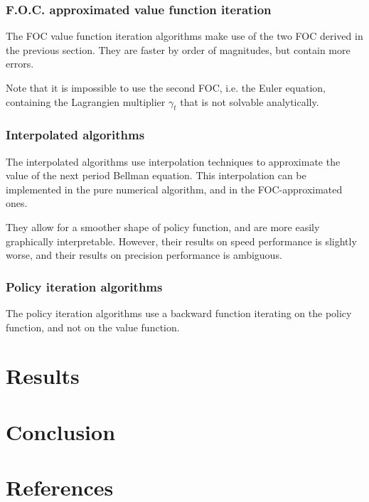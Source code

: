 \documentclass{article}
\begin{document}
\subsubsection{F.O.C. approximated value function iteration}

The FOC value function iteration algorithms
make use of the two FOC
derived in the previous section. 
They are faster by order of magnitudes,
but contain more errors.

Note that it is impossible to use the second FOC, i.e. the 
Euler equation, containing the 
Lagrangien multiplier $\gamma_{t}$ that
is not solvable analytically. 

\subsubsection{Interpolated algorithms}

The interpolated algorithms 
use interpolation techniques to approximate 
the value of the next period Bellman equation. 
This interpolation can be implemented in the pure numerical 
algorithm, and in the FOC-approximated ones. 

They allow for a smoother shape of policy function, 
and are more easily graphically interpretable.
However, 
their results on speed
performance is slightly worse, 
and their results on precision
performance is ambiguous. 

\subsubsection{Policy iteration algorithms}

The policy iteration algorithms use a 
backward function iterating on the policy function, 
and not on the value function.

\section{Results}



\section{Conclusion}

\section{References}

\printbibliography
\end{document}

